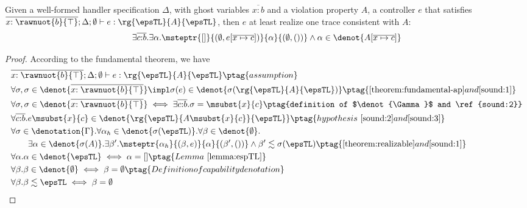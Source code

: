 \begin{theorem}\label{theorem:sound-ap} Given
  a well-formed handler specification $\Delta$, with ghost variables $\overline{x{:}b}$ and a violation property $A$, a controller $e$ that satisfies
  $\overline{x{:\rawnuot{b}{\top}}};\Delta; \emptyset \vdash e : \rg{\epsTL}{A}{\epsTL}$, then $e$ at least realize one trace consistent with $A$:
 {\footnotesize\begin{align*} \exists
    \overline{c{:}b}. \exists \alpha. \msteptr{[]}{(\emptyset,
      e[\overline{x\mapsto c}])}{\alpha}{(\emptyset, ())} \land \alpha \in
    \denot{A[\overline{x\mapsto c}]}
\end{align*}}
\end{theorem}
\begin{proof} According to the fundamental theorem, we have
{\footnotesize\begin{alignat}{2}
\setcounter{equation}{0}
    &\overline{x{:\rawnuot{b}{\top}}} ;\Delta; \emptyset \vdash e : \rg{\epsTL}{A}{\epsTL} \ptag{assumption} \label{sound:1}
    \\&\forall \sigma, \sigma \in
    \denot{\overline{x{:\rawnuot{b}{\top}}}} \impl \sigma(e) \in
    \denot{\sigma(\rg{\epsTL}{A}{\epsTL})} \ptag{\autoref{theorem:fundamental-ap} and \ref{sound:1}} \label{sound:2}
    \\&\forall \sigma, \sigma \in
    \denot{\overline{x{:\rawnuot{b}{\top}}}} \iff \exists \overline{c{:}b}. \sigma =\msubst{x}{c}  \ptag{definition of $\denot{\Gamma}$ and \ref{sound:2}}  \label{sound:3}
    \\&\forall \overline{c{:}b}. e\msubst{x}{c} \in
    \denot{\rg{\epsTL}{A\msubst{x}{c}}{\epsTL}} \ptag{hypothesis~\ref{sound:2} and \ref{sound:3}} \label{sound:4}
    \\&\forall \sigma \in
    \denotation{\Gamma}. \forall \alpha_h \in \denot{\sigma(\epsTL)}.\forall \beta \in \denot{\emptyset}. \notag
    \\&\qquad \exists \alpha \in \denot{\sigma(A)}.\exists \beta'. \msteptr{\alpha_h}{(\beta, e)}{\alpha}{(\beta', ())} \land \beta' \realz \sigma(\epsTL)
    \ptag{\autoref{theorem:realizable} and \ref{sound:1}} \label{sound:5}
    \\&\forall \alpha. \alpha \in \denot{\epsTL} \iff \alpha = []
    \ptag{Lemma~\ref{lemma:espTL}} \label{sound:6}
    \\&\forall \beta. \beta \in \denot{\emptyset} \iff \beta = \emptyset
    \ptag{Definition of capability denotation} \label{sound:7}
    \\&\forall \beta. \beta \realz \epsTL \iff \beta = \emptyset

\end{alignat}}
\end{proof}

